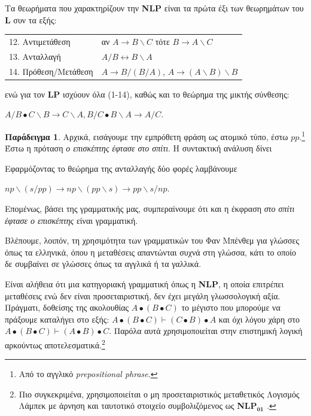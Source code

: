 \documentclass [a4paper,11pt] {book}
\theoremstyle{definition}
\newtheorem{example}[theorem]{Παράδειγμα}
\theoremstyle{definition}
\newenvironment{remark}[1][Παρατήρηση]{\begin{trivlist}
\item[\hskip \labelsep {\bfseries #1}]}{\end{trivlist}}
\begin{document}
Τα θεωρήματα που χαρακτηρίζουν την \textbf{NLP} είναι τα πρώτα έξι των θεωρημάτων του \textbf{L} συν τα εξής:
\begin{flushleft}
\begin{tabular}{ll}
12. Αντιμετάθεση\index{αντιμετάθεση} & αν $A\to B\backslash C$ τότε $B\to A\backslash C$\\
13. Ανταλλαγή\index{ανταλλαγή} & $A/B \leftrightarrow B\backslash A$\\
14. Πρόθεση/Μετάθεση\index{πρόθεση}\index{μετάθεση} & $A\to B/(B/A)$, $A\to (A\backslash B) \backslash B$
\end{tabular}
\end{flushleft}
ενώ για τον \textbf{LP} ισχύουν όλα (1-14), καθώς και το θεώρημα της μικτής σύνθεσης:

$A/B \bullet C\backslash B \to C\backslash A, B/C \bullet B\backslash A \to A/C$.
\begin{example}
\label{LPexample}
Αρχικά, εισάγουμε την εμπρόθετη φράση ως ατομικό τύπο, έστω $pp$.\footnote{Από το αγγλικό \textit{prepositional phrase}.} Έστω η πρόταση \textit{ο επισκέπτης έφτασε στο σπίτι}. Η συντακτική ανάλυση δίνει
\begin{prooftree}
\end{prooftree}
Εφαρμόζοντας το θεώρημα της ανταλλαγής δύο φορές λαμβάνουμε
\begin{center}
$np \backslash (s/pp) \to np \backslash (pp \backslash s) \to pp\backslash s/np$.
\end{center}
Επομένως, βάσει της γραμματικής μας, συμπεραίνουμε ότι και η έκφραση \textit{στο σπίτι έφτασε ο επισκέπτης} είναι γραμματική.
\end{example}
Βλέπουμε, λοιπόν, τη χρησιμότητα των γραμματικών του Φαν Μπένθεμ για γλώσσες όπως τα ελληνικά, όπου η μεταθέσεις απαντώνται συχνά στη γλώσσα, κάτι το οποίο δε συμβαίνει σε γλώσσες όπως τα αγγλικά ή τα γαλλικά.
\begin{remark}
Είναι αλήθεια ότι μια κατηγοριακή γραμματική όπως η \textbf{NLP}, η οποία επιτρέπει μεταθέσεις ενώ δεν είναι προσεταιριστική, δεν έχει μεγάλη γλωσσολογική αξία. Πράγματι, δοθείσης της ακολουθίας $A\bullet(B\bullet C)$ το μέγιστο που μπορούμε να πράξουμε καταλήγει στο εξής: $A\bullet(B\bullet C)\vdash (C\bullet B)\bullet A$ και όχι λόγου χάρη στο $A\bullet(B\bullet C)\vdash (A\bullet B)\bullet C$. Παρόλα αυτά χρησιμοποιείται στην επιστημική λογική αρκούντως αποτελεσματικά.\footnote{Πιο συγκεκριμένα, χρησιμοποιείται ο μη προσεταιριστικός μεταθετικός Λογισμός Λάμπεκ με άρνηση και ταυτοτικό στοιχείο συμβολιζόμενος ως \textbf{NLP$_{\textbf{01}}$} \citep{citeulike:8401096}.}
\end{remark}
\end{document}
